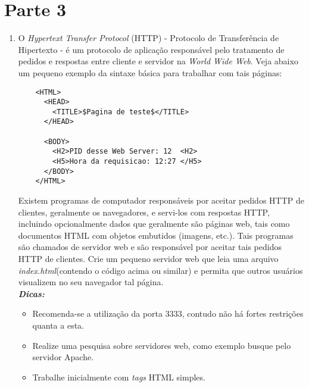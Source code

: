 \documentclass[a4paper,10pt]{article}
\begin{document}
\section{Parte 3}
  \begin{enumerate}

   \item O \emph{Hypertext Transfer Protocol} (HTTP) - Protocolo de Transferência de Hipertexto - é um protocolo de aplicação responsável pelo tratamento 
	de pedidos e respostas entre cliente e servidor na \emph{World Wide Web}. Veja abaixo um pequeno exemplo da sintaxe básica para trabalhar com 
	tais páginas:\\
\begin{verbatim}
 	<HTML>
	  <HEAD>
	    <TITLE>$Pagina de teste$</TITLE>
	  </HEAD>
          
	  <BODY>
	    <H2>PID desse Web Server: 12  <H2>
	    <H5>Hora da requisicao: 12:27 </H5>
	  </BODY>
	</HTML>
\end{verbatim}
	Existem programas de computador responsáveis por aceitar pedidos HTTP de clientes, geralmente os navegadores, e servi-los com respostas HTTP,
	incluindo opcionalmente dados que geralmente são páginas web, tais como documentos HTML com objetos embutidos (imagens, etc.). Tais programas 
	são chamados de servidor web e são responsável por aceitar tais pedidos HTTP de clientes. Crie um pequeno servidor web que leia uma arquivo 
	\emph{index.html}(contendo o código acima ou similar) e permita que outros usuários visualizem no seu navegador tal página. \\
	\textbf{\emph{Dicas:}}
	\begin{itemize}
	 \item Recomenda-se a utilização da porta 3333, contudo não há fortes restrições quanta a esta.
	 \item Realize uma pesquisa sobre servidores web, como exemplo busque pelo servidor Apache.
	 \item Trabalhe inicialmente com \emph{tags} HTML simples.
	\end{itemize}


\end{enumerate}
\end{document}
